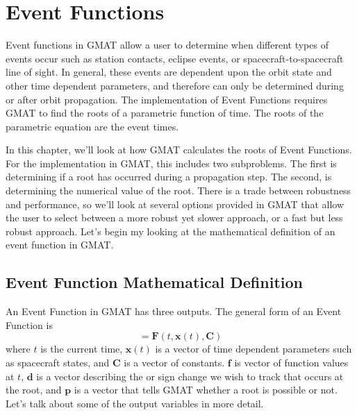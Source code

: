 \chapter{Event Functions}  \label{Ch:UGEvents}



Event functions in GMAT  allow a user to determine when different
types of events occur such as station contacts, eclipse events, or
spacecraft-to-spacecraft line of sight. In general, these events are
dependent upon the orbit state and other time dependent parameters,
and therefore can only be determined during or after orbit
propagation.  The implementation of Event Functions requires GMAT to
find the roots of a parametric function of time.  The roots of the
parametric equation are the event times.

In this chapter, we'll look at how GMAT calculates the roots of
Event Functions.  For the implementation in GMAT, this includes two
subproblems.  The first is determining if a root has occurred during
a propagation step.  The second, is determining the numerical value
of the root.  There is a trade between robustness and performance,
so we'll look at several options provided in GMAT that allow the
user to select between a more robust yet slower approach, or a fast
but less robust approach.  Let's begin my looking at the
mathematical definition of an event function in GMAT.

\section{Event Function Mathematical Definition}
\label{sec:EventFunctionMathDef}

An Event Function in GMAT has three outputs. The general form of an
Event Function is
%
\begin{equation}
    [\hspace{.05 in} \mathbf{f}, \mathbf{d}, \mathbf{p} \hspace{.05 in}] = \mathbf{F} (t, \mathbf{x}(t),\mathbf{C}
    ) \label{Eq:GeneralEventFunction}
\end{equation}
%
where $t$ is the current time, $\mathbf{x}(t)$ is a vector of time
dependent parameters such as spacecraft states, and $\mathbf{C}$ is
a vector of constants.  $\mathbf{f}$ is vector of function values at
$t$, $\mathbf{d}$ is a vector describing the or sign change we wish
to track that occurs at the root, and $\mathbf{p}$ is a vector that
tells GMAT whether a root is possible or not.  Let's talk about some
of the output variables in more detail.

